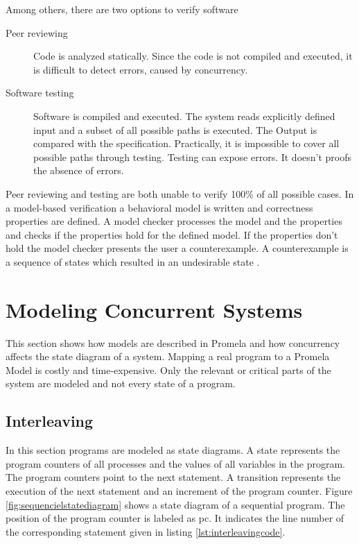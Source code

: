 \documentclass[12pt,a4paper,twoside]{article}
\begin{document}
Among others, there are two options to verify software
\begin{description}
\item[Peer reviewing] Code is analyzed statically. Since the code is not compiled and executed, it is difficult to detect errors, caused by concurrency.
\item[Software testing] Software is compiled and executed. The system reads explicitly defined input and a subset of all possible paths is executed. The Output is compared with the specification. Practically, it is impossible to cover all possible paths through testing. Testing can expose errors. It doesn't proofs the absence of errors.
\end{description}

Peer reviewing and testing are both unable to verify 100\% of all possible cases. In a model-based verification a behavioral model is written and correctness properties are defined. A model checker processes the model and the properties and checks if the properties hold for the defined model. If the properties don't hold the model checker presents the user a counterexample. A counterexample is a sequence of states which resulted in an undesirable state \cite{baier08}.

\section{Modeling Concurrent Systems}
\label{sec:concurrency}

This section shows how models are described in Promela and how concurrency affects the state diagram of a system. Mapping a real program to a Promela Model is costly and time-expensive. Only the relevant or critical parts of the system are modeled and not every state of a program.


\subsection{Interleaving}
\label{sec:interleaving}

In this section programs are modeled as state diagrams. A state represents the program counters of all processes and the values of all variables in the program. The program counters point to the next statement. A transition represents the execution of the next statement and an increment of the program counter. Figure \ref{fig:sequencielstatediagram} shows a state diagram of a sequential program. The position of the program counter is labeled as pc. It indicates the line number of the corresponding statement given in listing \ref{lst:interleavingcode}. 
\end{document}
